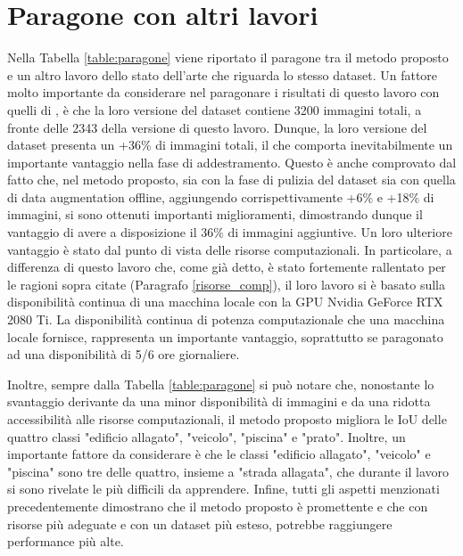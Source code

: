 \section{Paragone con altri lavori}
\label{comparison}
Nella Tabella \ref{table:paragone} viene riportato il paragone tra il metodo proposto e un altro lavoro dello stato dell'arte \cite{floodnet} che riguarda lo stesso dataset. 
Un fattore molto importante da considerare nel paragonare i risultati di questo lavoro con quelli di \cite{floodnet}, è che la loro versione del dataset contiene 3200 immagini totali, a fronte delle 2343 della versione di questo lavoro. Dunque, la loro versione del dataset presenta un +36\% di immagini totali, il che comporta inevitabilmente un importante vantaggio nella fase di addestramento. Questo è anche comprovato dal fatto che, nel metodo proposto, sia con la fase di pulizia del dataset sia con quella di data augmentation offline, aggiungendo corrispettivamente +6\% e +18\% di immagini, si sono ottenuti importanti miglioramenti, dimostrando dunque il vantaggio di avere a disposizione il 36\% di immagini aggiuntive. Un loro ulteriore vantaggio è stato dal punto di vista delle risorse computazionali. In particolare, a differenza di questo lavoro che, come già detto, è stato fortemente rallentato per le ragioni sopra citate (Paragrafo \ref{risorse_comp}), il loro lavoro si è basato sulla disponibilità continua di una macchina locale con la GPU Nvidia GeForce RTX 2080 Ti. La disponibilità continua di potenza computazionale che una macchina locale fornisce, rappresenta un importante vantaggio, soprattutto se paragonato ad una disponibilità di 5/6 ore giornaliere. 



Inoltre, sempre dalla Tabella \ref{table:paragone} si può notare che, nonostante lo svantaggio derivante da una minor disponibilità di immagini e da una ridotta accessibilità alle risorse computazionali, il metodo proposto migliora le IoU delle quattro classi "edificio allagato", "veicolo", "piscina" e "prato". Inoltre, un importante fattore da considerare è che le classi "edificio allagato", "veicolo" e "piscina" sono tre delle quattro, insieme a "strada allagata", che durante il lavoro si sono rivelate le più difficili da apprendere. Infine, tutti gli aspetti menzionati precedentemente dimostrano che il metodo proposto è promettente e che con risorse più adeguate e con un dataset più esteso, potrebbe raggiungere performance più alte.


